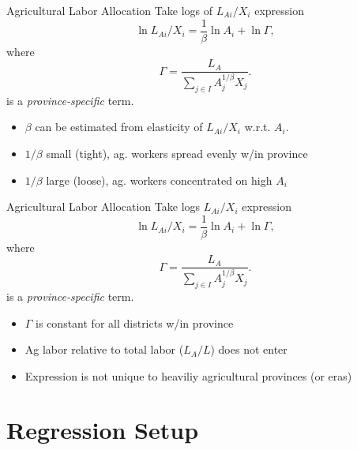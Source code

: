 \documentclass[10pt, xcolor=dvipsnames]{beamer}
\begin{document}
\begin{frame}{Agricultural Labor Allocation}
Take logs of $L_{Ai}/X_i$ expression
\begin{equation}
\ln L_{Ai}/X_i = \frac{1}{\beta} \ln A_{i} + \ln \Gamma, \label{EQ_est}
\end{equation}
where
\begin{equation}
    \Gamma = \frac{L_A}{\sum_{j\in I} A_{j}^{1/\beta}X_{j}}.
\end{equation}
is a \textit{province-specific} term. 

\begin{itemize}
  \item $\beta$ can be estimated from elasticity of $L_{Ai}/X_i$ w.r.t. $A_i$. 
  \item $1/\beta$ small (tight), ag. workers spread evenly w/in province
  \item $1/\beta$ large (loose), ag. workers concentrated on high $A_i$
\end{itemize}
\end{frame}

\begin{frame}{Agricultural Labor Allocation}\label{model}
Take logs $L_{Ai}/X_i$ expression
\begin{equation}
\ln L_{Ai}/X_i = \frac{1}{\beta} \ln A_{i} + \ln \Gamma, \label{EQ_est}
\end{equation}
where
\begin{equation}
    \Gamma = \frac{L_A}{\sum_{j\in I} A_{j}^{1/\beta}X_{j}}.
\end{equation}
is a \textit{province-specific} term. 

\begin{itemize}
  \item $\Gamma$ is constant for all districts w/in province
  \item Ag labor relative to total labor ($L_A/L$) does not enter
  \item Expression is not unique to heaviliy agricultural provinces (or eras)
\end{itemize}

\hfill \hyperlink{extend}{}
\end{frame}

\section{Regression Setup}
\end{document}
